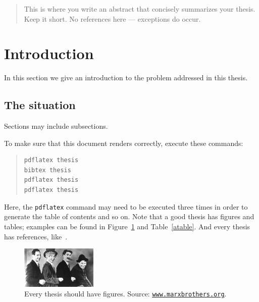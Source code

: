 \documentclass[12pt]{article}
\begin{document}


\begin{abstract}
\noindent
This is where you write an abstract that concisely summarizes your thesis.
Keep it short. No references here --- exceptions do occur.
\end{abstract}

\bigskip

\thispagestyle{empty}
\tableofcontents
\thispagestyle{empty}

\clearpage
\setcounter{page}{1}

\section{Introduction} \label{introduction}

In this section we give an introduction to the problem addressed in this thesis.


\subsection{The situation}

Sections may include subsections.

To make sure that this document renders correctly, execute these commands:
\begin{quote}
\begin{verbatim}
pdflatex thesis
bibtex thesis
pdflatex thesis
pdflatex thesis
\end{verbatim}
\end{quote}
Here, the \verb|pdflatex| command may need to be executed three times in order to generate the table of contents and so on. 
Note that a good thesis has figures and tables; examples can be found in Figure~\ref{afigure} and Table~\ref{atable}. And every thesis has references, like~\cite{whatagreatpaper}.

\begin{figure}[!htbp]
\begin{center}
\includegraphics[height=2cm]{marxbrothers2}
\end{center}
\caption{Every thesis should have figures. Source: \href{www.marxbrothers.org}{\underline{\texttt{www.marxbrothers.org}}}.}\label{afigure}
\end{figure}
\end{document}
